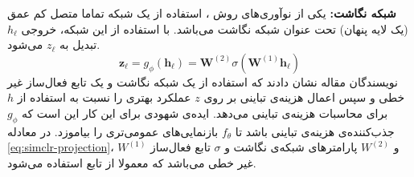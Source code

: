 \noindent\textbf{شبکه نگاشت:}
یکی از نوآوری‌های روش ،
استفاده از یک شبکه تماما متصل کم عمق (یک لایه پنهان) تحت عنوان شبکه نگاشت می‌باشد. با استفاده از این شبکه، خروجی $h_\ell$
تبدیل به $z_\ell$ می‌شود.
\begin{equation}
\label{eq:simclr-projection}
\boldsymbol{z}_\ell = g_\phi(\boldsymbol{h}_\ell) = \boldsymbol{W}^{(2)} \sigma(\boldsymbol{W}^{(1)} \boldsymbol{h}_\ell)
\end{equation}
نویسندگان مقاله نشان دادند که استفاده از یک شبکه نگاشت و یک تابع فعال‌ساز غیر خطی و سپس اعمال هزینه‌ی تباینی بر روی
$z$
عملکرد بهتری را نسبت به استفاده از
$h$
برای محاسبات هزینه‌ی تباینی می‌دهد. ایده‌ی شهودی برای این کار این است که
$g_\phi$
جذب‌کننده‌ی هزینه‌ی تباینی باشد تا
$f_\theta$
بازنمایی‌های عمومی‌تری را بیاموزد.
در معادله \ref{eq:simclr-projection}،
$W^{(1)}$ و $W^{(2)}$ پارامترهای شبکه‌ی نگاشت و
$\sigma$ تابع فعال‌ساز غیر خطی می‌باشد که معمولا از تابع  استفاده می‌شود.

